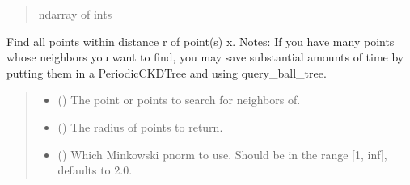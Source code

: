 \documentclass[a4paper,10pt,english]{report}
\begin{document}
\begin{fulllineitems}
\begin{fulllineitems}
\begin{quote}
\begin{description}
\sphinxAtStartPar
ndarray of ints

\end{description}\end{quote}

\end{fulllineitems}


\begin{fulllineitems}
\label{\detokenize{NNucleate:NNucleate.utils.PeriodicCKDTree.query_ball_point}}
\pysigstartsignatures
{}
\pysigstopsignatures
\sphinxAtStartPar
Find all points within distance r of point(s) x.
Notes: If you have many points whose neighbors you want to find, you may
save substantial amounts of time by putting them in a
PeriodicCKDTree and using query\_ball\_tree.
\begin{quote}\begin{description}
\begin{itemize}
\item {} 
\sphinxAtStartPar
{} (\sphinxstyleliteralemphasis{\sphinxupquote{, }}\sphinxstyleliteralemphasis{\sphinxupquote{ (}}\sphinxstyleliteralemphasis{\sphinxupquote{,}}\sphinxstyleliteralemphasis{\sphinxupquote{)}}) \textendash{} The point or points to search for neighbors of.

\item {} 
\sphinxAtStartPar
{} () \textendash{} The radius of points to return.

\item {} 
\sphinxAtStartPar
{} (\sphinxstyleliteralemphasis{\sphinxupquote{, }}) \textendash{} Which Minkowski p\sphinxhyphen{}norm to use.  Should be in the range {[}1, inf{]}, defaults to 2.0.


\end{itemize}
\end{description}
\end{quote}
\end{fulllineitems}
\end{fulllineitems}
\end{document}
